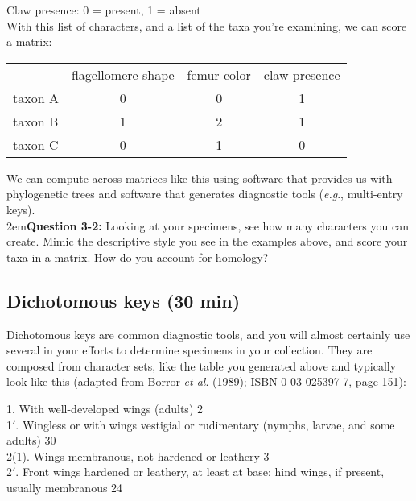 \documentclass[letterpaper, 11pt]{article}
\begin{document}
Claw presence: 0 = present, 1 = absent\\

With this list of characters, and a list of the taxa you're examining, we can score a matrix:
\begin{table}[H]
\centering
\label{my-label}
\begin{tabular}{lccc}
                             & \multicolumn{1}{l}{flagellomere shape} & \multicolumn{1}{l}{femur color} & \multicolumn{1}{l}{claw presence} \\ \cline{2-4} 
\multicolumn{1}{l|}{taxon A} & \multicolumn{1}{c|}{0}                 & \multicolumn{1}{c|}{0}          & \multicolumn{1}{c|}{1}            \\ \cline{2-4} 
\multicolumn{1}{l|}{taxon B} & \multicolumn{1}{c|}{1}                 & \multicolumn{1}{c|}{2}          & \multicolumn{1}{c|}{1}            \\ \cline{2-4} 
\multicolumn{1}{l|}{taxon C} & \multicolumn{1}{c|}{0}                 & \multicolumn{1}{c|}{1}          & \multicolumn{1}{c|}{0}            \\ \cline{2-4} 
\end{tabular}
\end{table}

\noindent{}We can compute across matrices like this using software that provides us with phylogenetic trees and software that generates diagnostic tools (\textit{e.g}., multi-entry keys).\\

\hangindent2em\textbf{Question 3-2:} Looking at your specimens, see how many characters you can create. Mimic the descriptive style you see in the examples above, and score your taxa in a matrix. How do you account for homology?\\

\subsection{Dichotomous keys (30 min)}
Dichotomous keys are common diagnostic tools, and you will almost certainly use several in your efforts to determine specimens in your collection. They are composed from character sets, like the table you generated above and typically look like this (adapted from Borror \textit{et al}. (1989); ISBN 0-03-025397-7, page 151):\\

\begin{adjustwidth}{1cm}{}
1. With well-developed wings (adults) \dotfill{} 2\\
1$'$. Wingless or with wings vestigial or rudimentary (nymphs, larvae, and some adults) \dotfill{} 30\\

\noindent{}2(1). Wings membranous, not hardened or leathery \dotfill{} 3\\
2$'$. Front wings hardened or leathery, at least at base; hind wings, if present, usually membranous \dotfill{}24\\
\end{adjustwidth}
\end{document}
